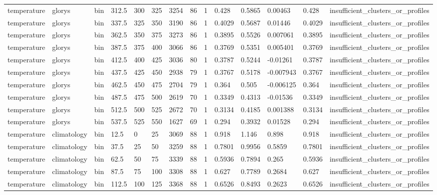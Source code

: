 \begin{table}[htbp]
\begin{tabular}{llllllllllllll}
temperature & glorys & bin & 312.5 & 300 & 325 & 3254 & 86 & 1 & 0.428 & 0.5865 & 0.00463 & 0.428 & insufficient\_clusters\_or\_profiles \\
temperature & glorys & bin & 337.5 & 325 & 350 & 3190 & 86 & 1 & 0.4029 & 0.5687 & 0.01446 & 0.4029 & insufficient\_clusters\_or\_profiles \\
temperature & glorys & bin & 362.5 & 350 & 375 & 3273 & 86 & 1 & 0.3895 & 0.5526 & 0.007061 & 0.3895 & insufficient\_clusters\_or\_profiles \\
temperature & glorys & bin & 387.5 & 375 & 400 & 3066 & 86 & 1 & 0.3769 & 0.5351 & 0.005401 & 0.3769 & insufficient\_clusters\_or\_profiles \\
temperature & glorys & bin & 412.5 & 400 & 425 & 3036 & 80 & 1 & 0.3787 & 0.5244 & -0.01261 & 0.3787 & insufficient\_clusters\_or\_profiles \\
temperature & glorys & bin & 437.5 & 425 & 450 & 2938 & 79 & 1 & 0.3767 & 0.5178 & -0.007943 & 0.3767 & insufficient\_clusters\_or\_profiles \\
temperature & glorys & bin & 462.5 & 450 & 475 & 2704 & 79 & 1 & 0.364 & 0.505 & -0.006125 & 0.364 & insufficient\_clusters\_or\_profiles \\
temperature & glorys & bin & 487.5 & 475 & 500 & 2619 & 70 & 1 & 0.3349 & 0.4313 & -0.01536 & 0.3349 & insufficient\_clusters\_or\_profiles \\
temperature & glorys & bin & 512.5 & 500 & 525 & 2672 & 70 & 1 & 0.3134 & 0.4185 & 0.001388 & 0.3134 & insufficient\_clusters\_or\_profiles \\
temperature & glorys & bin & 537.5 & 525 & 550 & 1627 & 69 & 1 & 0.294 & 0.3932 & 0.01528 & 0.294 & insufficient\_clusters\_or\_profiles \\
temperature & climatology & bin & 12.5 & 0 & 25 & 3069 & 88 & 1 & 0.918 & 1.146 & 0.898 & 0.918 & insufficient\_clusters\_or\_profiles \\
temperature & climatology & bin & 37.5 & 25 & 50 & 3259 & 88 & 1 & 0.7801 & 0.9956 & 0.5859 & 0.7801 & insufficient\_clusters\_or\_profiles \\
temperature & climatology & bin & 62.5 & 50 & 75 & 3339 & 88 & 1 & 0.5936 & 0.7894 & 0.265 & 0.5936 & insufficient\_clusters\_or\_profiles \\
temperature & climatology & bin & 87.5 & 75 & 100 & 3308 & 88 & 1 & 0.627 & 0.7789 & 0.2684 & 0.627 & insufficient\_clusters\_or\_profiles \\
temperature & climatology & bin & 112.5 & 100 & 125 & 3368 & 88 & 1 & 0.6526 & 0.8493 & 0.2623 & 0.6526 & insufficient\_clusters\_or\_profiles \\

\end{tabular}
\end{table}
